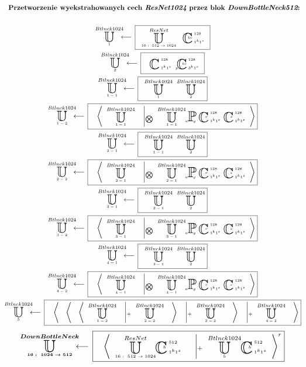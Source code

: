 \begin{equation*}
\begin{gathered}
\textbf{Przetworzenie wyekstrahowanych cech $\textit{ResNet1024}$ przez blok $\textit{DownBottleNeck512}$:}
\\~\\
\xunitdef{Btlnck1024}{1}{\quad
\xunit{ResNet}{16:\ 512\rightarrow1024}{} \quad
\xconv{\ 1^k1^s}{\ 128}{}{}{br}}
\\
\xunitdef{Btlnck1024}{2}{\quad
\xconv{\ 1^k1^s}{\ 128}{}{}{}
\xconv{\ 3^k1^s}{\ 128}{p}{}{br}}
\\
\xunitdef{Btlnck1024}{1-1}{\quad
\xunit{Btlnck1024}{1}{} \quad
\xunit{Btlnck1024}{2}{}}
\\
\xunitdef{Btlnck1024}{1-2}{\quad
\xaggreg{\quad
\xunit{Btlnck1024}{1-1}{}
\quad \left|_{\bigotimes} \quad
\xunit{Btlnck1024}{1-1}{}
\xpool{g}{}{a}{}{}
\xconv{\ 1^k1^s}{\ 128}{}{}{r}
\xconv{\ 1^k1^s}{\ 128}{}{}{s}
\right.}}
\\
\xunitdef{Btlnck1024}{2-1}{\quad
\xunit{Btlnck1024}{1-1}{} \quad
\xunit{Btlnck1024}{2}{}}
\\
\xunitdef{Btlnck1024}{2-2}{\quad
\xaggreg{\quad
\xunit{Btlnck1024}{2-1}{}
\quad \left|_{\bigotimes} \quad
\xunit{Btlnck1024}{2-1}{}
\xpool{g}{}{a}{}{}
\xconv{\ 1^k1^s}{\ 128}{}{}{r}
\xconv{\ 1^k1^s}{\ 128}{}{}{s}
\right.}}
\\
\xunitdef{Btlnck1024}{3-1}{\quad
\xunit{Btlnck1024}{2-1}{} \quad
\xunit{Btlnck1024}{2}{}}
\\
\xunitdef{Btlnck1024}{3-2}{\quad
\xaggreg{\quad
\xunit{Btlnck1024}{3-1}{}
\quad \left|_{\bigotimes} \quad
\xunit{Btlnck1024}{3-1}{}
\xpool{g}{}{a}{}{}
\xconv{\ 1^k1^s}{\ 128}{}{}{r}
\xconv{\ 1^k1^s}{\ 128}{}{}{s}
\right.}}
\\
\xunitdef{Btlnck1024}{4-1}{\quad
\xunit{Btlnck1024}{3-1}{} \quad
\xunit{Btlnck1024}{2}{}}
\\
\xunitdef{Btlnck1024}{4-2}{\quad
\xaggreg{\quad
\xunit{Btlnck1024}{4-1}{}
\quad \left|_{\bigotimes} \quad
\xunit{Btlnck1024}{4-1}{}
\xpool{g}{}{a}{}{}
\xconv{\ 1^k1^s}{\ 128}{}{}{r}
\xconv{\ 1^k1^s}{\ 128}{}{}{s}
\right.}}
\\
\xunitdef{Btlnck1024}{5}{\quad
\xaggreg{\quad
\xaggreg{\quad
\xaggreg{\quad
\xunit{Btlnck1024}{1-2}{}
\quad \left|_+ \quad
\xunit{Btlnck1024}{2-2}{}
\right.\quad}
\quad \left|_+ \quad
\xunit{Btlnck1024}{3-2}{}
\right.\quad}
\quad \left|_+ \quad
\xunit{Btlnck1024}{4-2}{}
\right.\quad}}
\end{gathered}
\end{equation*}
\begin{equation*}
\begin{gathered}
\xunitdef{\boldsymbol{DownBottleNeck}}{\boldsymbol{16:\ 1024\rightarrow512}}{\quad
\xaggreg{\quad
\xunit{ResNet}{16:\ 512\rightarrow1024}{}
\xconv{\ 1^k1^s}{\ 512}{}{}{b}
\quad \left|_+ \quad
\xunit{Btlnck1024}{5}{}
\xconv{\ 1^k1^s}{\ 512}{}{}{b}
\right.}^r}
\end{gathered}
\end{equation*}
